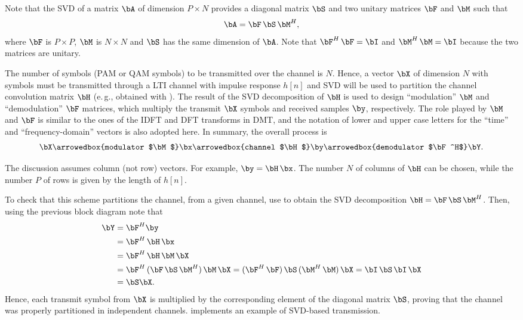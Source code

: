 Note that the SVD of a matrix $\bA$ of dimension $P \times N$ provides a diagonal matrix $\bS$ and two unitary matrices $\bF$ and $\bM$ such that
\begin{equation}
\bA = \bF \, \bS \, \bM^H,
\label{eq:svd_decomposition}
\end{equation}
where $\bF$ is $P \times P$, $\bM$ is $N \times N$ and $\bS$ has the same dimension of $\bA$.
Note that $\bF^H \, \bF = \bI$ and $\bM^H \, \bM = \bI$ because the two matrices are unitary.

The number of symbols (PAM or QAM symbols) to be transmitted over the channel is $N$.
Hence, a vector $\bX$ of dimension $N$ with symbols must be transmitted through a LTI channel with impulse response $h[n]$ and SVD will be used to partition the channel convolution matrix $\bH$ (e.\,g., obtained with ). The result of the SVD decomposition of $\bH$ is used to design ``modulation'' $\bM$ and ``demodulation'' $\bF$ matrices, which multiply the transmit $\bX$ symbols and received samples $\by$, respectively. The role played by $\bM$ and $\bF$ is similar to the ones of the IDFT and DFT transforms in DMT, and the notation of lower and upper case letters for the ``time'' and ``frequency-domain'' vectors is also adopted here. In summary, the overall process is
\[
\bX \arrowedbox{modulator $\bM$} \bx \arrowedbox{channel $\bH$} \by \arrowedbox{demodulator $\bF^H$} \bY.
\]

The discussion assumes column (not row) vectors. For example, $\by = \bH \, \bx$. The number $N$ of columns of $\bH$ can be chosen, while the number $P$ of rows is given by the length of $h[n]$.

To check that this scheme partitions the channel, from a given channel, use  to obtain the SVD decomposition $\bH = \bF \, \bS \, \bM^H$. Then, using the previous block diagram note that
\begin{align*}
\bY &= \bF^H \by \\
&= \bF^H \, \bH \, \bx \\
&= \bF^H \, \bH \, \bM \, \bX \\
&= \bF^H \, (\bF \, \bS \, \bM^H) \, \bM \, \bX  = (\bF^H \, \bF) \, \bS \, (\bM^H \, \bM) \, \bX  = \bI \, \bS \, \bI \, \bX \\
&= \bS \bX.
\end{align*}
Hence, each transmit symbol from $\bX$ is multiplied by the corresponding element of the diagonal matrix $\bS$, proving that the channel was properly partitioned in independent channels.
 implements an example of SVD-based transmission.

